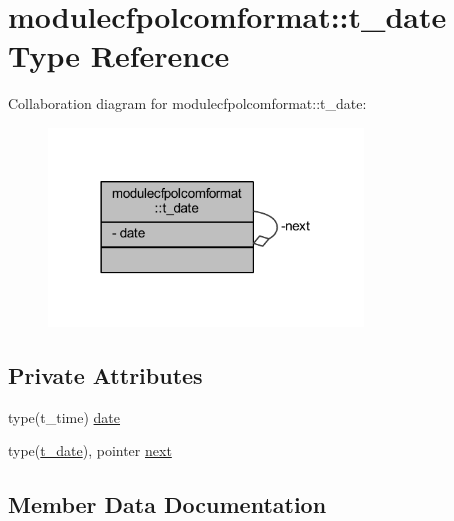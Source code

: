 \hypertarget{structmodulecfpolcomformat_1_1t__date}{}\section{modulecfpolcomformat\+:\+:t\+\_\+date Type Reference}
\label{structmodulecfpolcomformat_1_1t__date}


Collaboration diagram for modulecfpolcomformat\+:\+:t\+\_\+date\+:\nopagebreak
\begin{figure}[H]
\begin{center}
\leavevmode
\includegraphics[width=237pt]{structmodulecfpolcomformat_1_1t__date__coll__graph}
\end{center}
\end{figure}
\subsection*{Private Attributes}
\begin{DoxyCompactItemize}
\item 
type(t\+\_\+time) \mbox{\hyperlink{structmodulecfpolcomformat_1_1t__date_a9a36a4d16b5e397b0a88279f976bbc0f}{date}}
\item 
type(\mbox{\hyperlink{structmodulecfpolcomformat_1_1t__date}{t\+\_\+date}}), pointer \mbox{\hyperlink{structmodulecfpolcomformat_1_1t__date_a72b9d474b31aefa54b671131f6034a72}{next}}
\end{DoxyCompactItemize}


\subsection{Member Data Documentation}
\mbox{\label{structmodulecfpolcomformat_1_1t__date_a9a36a4d16b5e397b0a88279f976bbc0f}} 
